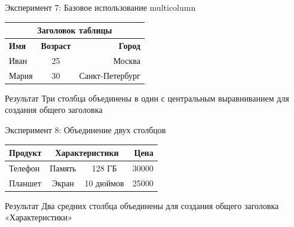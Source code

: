 \documentclass[aspectratio=169]{beamer}
\begin{document}
\begin{frame}{Эксперимент 7: Базовое использование multicolumn}
    \begin{center}
    \begin{tabular}{|l|c|r|}
    \hline
    \multicolumn{3}{|c|}{\textbf{Заголовок таблицы}} \\
    \hline
    \textbf{Имя} & \textbf{Возраст} & \textbf{Город} \\
    \hline
    Иван & 25 & Москва \\
    Мария & 30 & Санкт-Петербург \\
    \hline
    \end{tabular}
    \end{center}
    
    \vspace{0.5cm}
    
    \begin{block}{Результат}
        Три столбца объединены в один с центральным выравниванием для создания общего заголовка
    \end{block}
\end{frame}

\begin{frame}{Эксперимент 8: Объединение двух столбцов}
    \begin{center}
    \begin{tabular}{|l|c|c|r|}
    \hline
    \textbf{Продукт} & \multicolumn{2}{c|}{\textbf{Характеристики}} & \textbf{Цена} \\
    \hline
    Телефон & Память & 128 ГБ & 30000 \\
    Планшет & Экран & 10 дюймов & 25000 \\
    \hline
    \end{tabular}
    \end{center}
    
    \vspace{0.5cm}
    
    \begin{block}{Результат}
        Два средних столбца объединены для создания общего заголовка «Характеристики»
    \end{block}
\end{frame}
\end{document}
